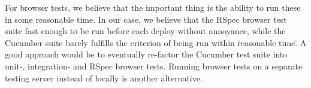 For browser tests, we believe that the important thing is the ability to
run these in some reasonable time. In our case, we believe that the
RSpec browser test suite fast enough to be run before each deploy
without annoyance, while the Cucumber suite barely fulfills the
criterion of being run within \"reasonable time\". A good approach would
be to eventually re-factor the Cucumber test suite into unit-,
integration- and RSpec browser tests. Running browser tests on a
separate testing server instead of locally is another alternative.\\


